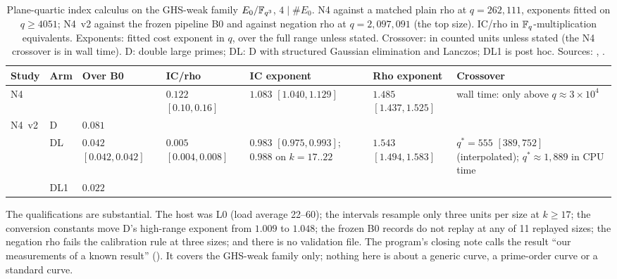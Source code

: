 \begin{table}[t]
\centering\small
\begin{tabularx}{\linewidth}{@{}ll>{\raggedright}p{1.9cm}>{\raggedright}p{2.0cm}>{\raggedright}p{2.3cm}>{\raggedright}p{2.2cm}>{\raggedright\arraybackslash}X@{}}
\toprule
Study & Arm & Over B0 & IC/rho & IC exponent & Rho exponent & Crossover \\
\midrule
N4 & & & $0.122$ $[0.10,0.16]$ & $1.083$ $[1.040,1.129]$ &
  $1.485$ $[1.437,1.525]$ & wall time: only above $q\approx3\times10^4$ \\
\addlinespace
N4~v2 & D & $0.081$ & & & & \\
 & DL & $0.042$ $[0.042,0.042]$ & $0.005$ $[0.004,0.008]$ &
  $0.983$ $[0.975,0.993]$; $0.988$ on $k=17..22$ & $1.543$ $[1.494,1.583]$ &
  $q^*=555$ $[389,752]$ (interpolated); $q^*\approx1{,}889$ in CPU time \\
 & DL1 & $0.022$ & & & & \\
\bottomrule
\end{tabularx}
\caption[]{Plane-quartic index calculus on the GHS-weak family
$E_0/\mathbb{F}_{q^3}$, $4\mid\#E_0$. N4 against a matched plain rho at
$q=262{,}111$, exponents fitted on $q\ge4051$; N4~v2 against the frozen
pipeline B0 and against negation rho at $q=2{,}097{,}091$ (the top size).
IC/rho in $\mathbb{F}_q$-multiplication equivalents. Exponents: fitted cost
exponent in $q$, over the full range unless stated. Crossover: in counted
units unless stated (the N4 crossover is in wall time).
D: double large primes; DL: D with structured Gaussian elimination and
Lanczos; DL1 is post hoc. Sources: ,
.}
\label{tab:prog_transfer-quartic}
\end{table}
The qualifications are substantial. The host was L0 (load average 22--60);
the intervals resample only three units per size at $k\ge17$; the
conversion constants move D's high-range exponent from $1.009$ to $1.048$;
the frozen B0 records do not replay at any of 11 replayed sizes; the
negation rho fails the calibration rule at three sizes; and there is no
validation file. The program's closing note calls the result ``our
measurements of a known result''
(). It covers the
GHS-weak family only; nothing here is about a generic curve, a prime-order
curve or a standard curve.


